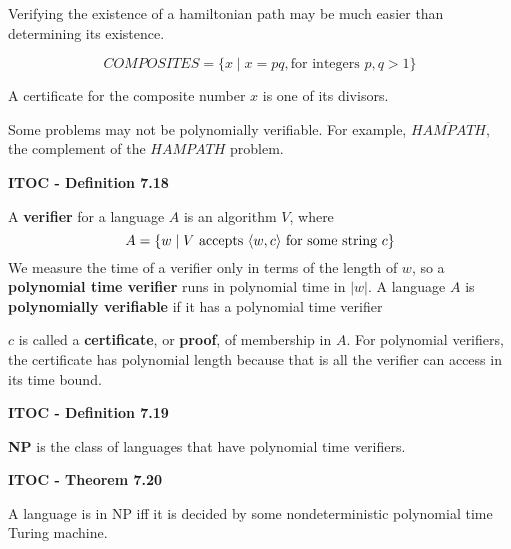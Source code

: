 Verifying the existence of a hamiltonian path may be much easier than determining its existence.

\[
COMPOSITES = \{x \mid x = pq, \text{for integers } p, q > 1 \}
\]
\label{lang:COMPOSITES_NP}
\begin{mdframed}
A certificate for the composite number $x$ is one of its divisors.
\end{mdframed}

Some problems may not be polynomially verifiable. For example, $\overline{HAMPATH}$, the complement of the $HAMPATH$ problem.

\begin{shaded}
\textbf{ITOC - Definition 7.18}

\medskip
A \textbf{verifier} for a language $A$ is an algorithm $V$, where
\[
A = \{w \mid \text{$V$ accepts $\langle{w, c}\rangle$ for some string $c$} \}
\]
We measure the time of a verifier only in terms of the length of $w$, so a \textbf{polynomial time verifier} runs in polynomial time in $|w|$. A language $A$ is \textbf{polynomially verifiable} if it has a polynomial time verifier
\end{shaded}

$c$ is called a \textbf{certificate}, or \textbf{proof}, of membership in $A$. For polynomial verifiers, the certificate has polynomial length because that is all the verifier can access in its time bound.

\begin{shaded}
\textbf{ITOC - Definition 7.19}

\medskip
\textbf{NP} is the class of languages that have polynomial time verifiers.
\end{shaded}

\begin{shaded}
\textbf{ITOC - Theorem 7.20}

\medskip
A language is in NP iff it is decided by some nondeterministic polynomial time Turing machine.
\end{shaded}


